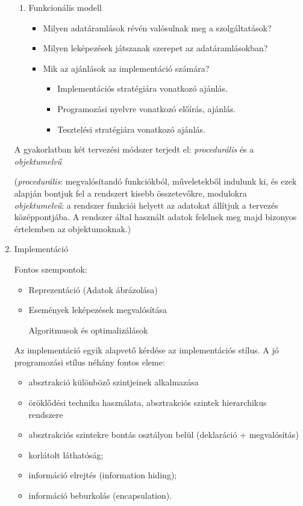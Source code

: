 \documentclass[margin=0px]{article}
\begin{document}
\begin{enumerate}
\begin{enumerate}
					\item Funkcionális modell
					\begin{itemize}
						\item Milyen adatáramlások révén valósulnak meg a szolgáltatások?
						\item Milyen leképezések játszanak szerepet az adatáramlásokban?
						\item Mik az ajánlások az implementáció számára?
						\begin{itemize}
							\item Implementációs stratégiára vonatkozó ajánlás.
							\item Programozási nyelvre vonatkozó előírás, ajánlás.
							\item Tesztelési stratégiára vonatkozó ajánlás.
						\end{itemize}
					\end{itemize}
				\end{enumerate}
				
				A gyakorlatban két tervezési módszer terjedt el:
				\textit{procedurális} és a \textit{objektumelvű}
				
				(\textit{procedurális}: megvalósítandó funkciókból, műveletekből indulunk ki, és ezek alapján bontjuk fel a rendszert kisebb összetevőkre, modulokra\\
				\textit{objektumelvű}: a rendszer funkciói helyett az
				adatokat állítjuk a tervezés középpontjába. A rendszer által használt
				adatok felelnek meg majd bizonyos értelemben az objektumoknak.)
			
			\item Implementáció
			
				Fontos szempontok:
				\begin{itemize}
					\item Reprezentáció (Adatok ábrázolása)
					\item Események leképezések megvalósítása
	
						Algoritmusok és optimalizálások
				\end{itemize}
				
				Az implementáció egyik alapvető kérdése az implementációs stílus.
				A jó programozási stílus néhány fontos eleme:
				\begin{itemize}
					\item absztrakció különböző szintjeinek alkalmazása
					\item öröklődési technika használata, absztrakciós szintek hierarchikus
					rendszere
					\item absztrakciós szintekre bontás osztályon belül (deklaráció + megvalósítás)
					\item korlátolt láthatóság;
					\item információ elrejtés (information hiding);
					\item információ beburkolás (encapsulation).
				\end{itemize}
				

\end{enumerate}
\end{document}
